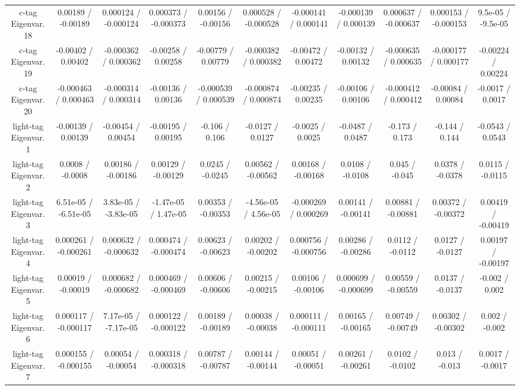 \begin{table}[htbp]
\begin{center}
\begin{tabular}{|c|c|c|c|c|c|c|c|c|c|c|}
  c-tag Eigenvar. 18 & 0.00189 / -0.00189 & 0.000124 / -0.000124 & 0.000373 / -0.000373 & 0.00156 / -0.00156 & 0.000528 / -0.000528 & -0.000141 / 0.000141 & -0.000139 / 0.000139 & 0.000637 / -0.000637 & 0.000153 / -0.000153 & 9.5e-05 / -9.5e-05 \\ 
  c-tag Eigenvar. 19 & -0.00402 / 0.00402 & -0.000362 / 0.000362 & -0.00258 / 0.00258 & -0.00779 / 0.00779 & -0.000382 / 0.000382 & -0.00472 / 0.00472 & -0.00132 / 0.00132 & -0.000635 / 0.000635 & -0.000177 / 0.000177 & -0.00224 / 0.00224 \\ 
  c-tag Eigenvar. 20 & -0.000463 / 0.000463 & -0.000314 / 0.000314 & -0.00136 / 0.00136 & -0.000539 / 0.000539 & -0.000874 / 0.000874 & -0.00235 / 0.00235 & -0.00106 / 0.00106 & -0.000412 / 0.000412 & -0.00084 / 0.00084 & -0.0017 / 0.0017 \\ 
  light-tag Eigenvar. 1 & -0.00139 / 0.00139 & -0.00454 / 0.00454 & -0.00195 / 0.00195 & -0.106 / 0.106 & -0.0127 / 0.0127 & -0.0025 / 0.0025 & -0.0487 / 0.0487 & -0.173 / 0.173 & -0.144 / 0.144 & -0.0543 / 0.0543 \\ 
  light-tag Eigenvar. 2 & 0.0008 / -0.0008 & 0.00186 / -0.00186 & 0.00129 / -0.00129 & 0.0245 / -0.0245 & 0.00562 / -0.00562 & 0.00168 / -0.00168 & 0.0108 / -0.0108 & 0.045 / -0.045 & 0.0378 / -0.0378 & 0.0115 / -0.0115 \\ 
  light-tag Eigenvar. 3 & 6.51e-05 / -6.51e-05 & 3.83e-05 / -3.83e-05 & -1.47e-05 / 1.47e-05 & 0.00353 / -0.00353 & -4.56e-05 / 4.56e-05 & -0.000269 / 0.000269 & 0.00141 / -0.00141 & 0.00881 / -0.00881 & 0.00372 / -0.00372 & 0.00419 / -0.00419 \\ 
  light-tag Eigenvar. 4 & 0.000261 / -0.000261 & 0.000632 / -0.000632 & 0.000474 / -0.000474 & 0.00623 / -0.00623 & 0.00202 / -0.00202 & 0.000756 / -0.000756 & 0.00286 / -0.00286 & 0.0112 / -0.0112 & 0.0127 / -0.0127 & 0.00197 / -0.00197 \\ 
  light-tag Eigenvar. 5 & 0.00019 / -0.00019 & 0.000682 / -0.000682 & 0.000469 / -0.000469 & 0.00606 / -0.00606 & 0.00215 / -0.00215 & 0.00106 / -0.00106 & 0.000699 / -0.000699 & 0.00559 / -0.00559 & 0.0137 / -0.0137 & -0.002 / 0.002 \\ 
  light-tag Eigenvar. 6 & 0.000117 / -0.000117 & 7.17e-05 / -7.17e-05 & 0.000122 / -0.000122 & 0.00189 / -0.00189 & 0.00038 / -0.00038 & 0.000111 / -0.000111 & 0.00165 / -0.00165 & 0.00749 / -0.00749 & 0.00302 / -0.00302 & 0.002 / -0.002 \\ 
  light-tag Eigenvar. 7 & 0.000155 / -0.000155 & 0.00054 / -0.00054 & 0.000318 / -0.000318 & 0.00787 / -0.00787 & 0.00144 / -0.00144 & 0.00051 / -0.00051 & 0.00261 / -0.00261 & 0.0102 / -0.0102 & 0.013 / -0.013 & 0.0017 / -0.0017 \\ 

\end{tabular}
\end{center}
\end{table}
